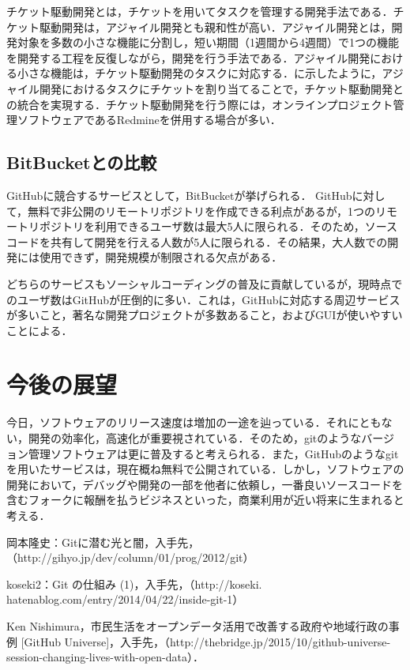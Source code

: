 \documentclass[a4j,9pt,twocolumn]{jsarticle}
\begin{document}
チケット駆動開発とは，チケットを用いてタスクを管理する開発手法である．チケット駆動開発は，アジャイル開発とも親和性が高い．アジャイル開発とは，開発対象を多数の小さな機能に分割し，短い期間（1週間から4週間）で1つの機能を開発する工程を反復しながら，開発を行う手法である．アジャイル開発における小さな機能は，チケット駆動開発のタスクに対応する．に示したように，アジャイル開発におけるタスクにチケットを割り当てることで，チケット駆動開発との統合を実現する．チケット駆動開発を行う際には，オンラインプロジェクト管理ソフトウェアであるRedmineを併用する場合が多い．

\subsection{BitBucketとの比較}
GitHubに競合するサービスとして，BitBucketが挙げられる． GitHubに対して，無料で非公開のリモートリポジトリを作成できる利点があるが，1つのリモートリポジトリを利用できるユーザ数は最大5人に限られる．そのため，ソースコードを共有して開発を行える人数が5人に限られる．その結果，大人数での開発には使用できず，開発規模が制限される欠点がある．

どちらのサービスもソーシャルコーディングの普及に貢献しているが，現時点でのユーザ数はGitHubが圧倒的に多い．これは，GitHubに対応する周辺サービスが多いこと，著名な開発プロジェクトが多数あること，およびGUIが使いやすいことによる．

\section{今後の展望}
今日，ソフトウェアのリリース速度は増加の一途を辿っている．それにともない，開発の効率化，高速化が重要視されている．そのため，gitのようなバージョン管理ソフトウェアは更に普及すると考えられる．また，GitHubのようなgitを用いたサービスは，現在概ね無料で公開されている．しかし，ソフトウェアの開発において，デバッグや開発の一部を他者に依頼し，一番良いソースコードを含むフォークに報酬を払うビジネスといった，商業利用が近い将来に生まれると考える．

\small
\begin{thebibliography}{99}
岡本隆史：Gitに潜む光と闇，入手先，（http://gihyo.jp/dev/column/01/prog/2012/git）

koseki2：Git の仕組み (1)，入手先，（http://koseki.\\hatenablog.com/entry/2014/04/22/inside-git-1）

Ken Nishimura，市民生活をオープンデータ活用で改善する政府や地域行政の事例 [GitHub Universe]，入手先，（http://thebridge.jp/2015/10/github-universe-session-changing-lives-with-open-data）．
\end{thebibliography}
\end{document}
